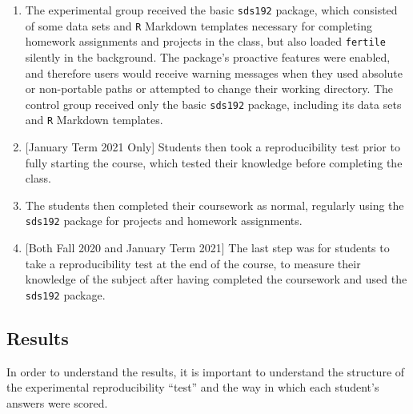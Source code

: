 \documentclass[12pt,twoside]{reedthesis}
\begin{document}
\begin{enumerate}
\def\labelenumi{\arabic{enumi}.}
\setcounter{enumi}{4}
\item
  The experimental group received the basic \texttt{sds192} package, which consisted of some data sets and \texttt{R} Markdown templates necessary for completing homework assignments and projects in the class, but also loaded \texttt{fertile} silently in the background. The package's proactive features were enabled, and therefore users would receive warning messages when they used absolute or non-portable paths or attempted to change their working directory. The control group received only the basic \texttt{sds192} package, including its data sets and \texttt{R} Markdown templates.
\item
  {[}January Term 2021 Only{]} Students then took a reproducibility test prior to fully starting the course, which tested their knowledge before completing the class.
\item
  The students then completed their coursework as normal, regularly using the \texttt{sds192} package for projects and homework assignments.
\item
  {[}Both Fall 2020 and January Term 2021{]} The last step was for students to take a reproducibility test at the end of the course, to measure their knowledge of the subject after having completed the coursework and used the \texttt{sds192} package.
\end{enumerate}
\hypertarget{results}{%
\subsection{Results}\label{results}}

In order to understand the results, it is important to understand the structure of the experimental reproducibility ``test'' and the way in which each student's answers were scored.
\end{document}
